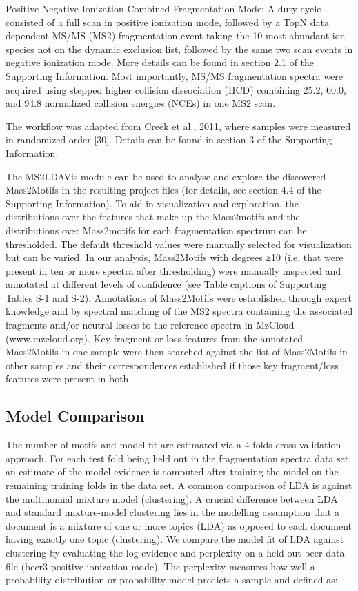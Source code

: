 Positive Negative Ionization Combined Fragmentation Mode:
A duty cycle consisted of a full scan in positive ionization mode, followed by a TopN data dependent MS/MS (MS2) fragmentation event taking the 10 most abundant ion species not on the dynamic exclusion list, followed by the same two scan events in negative ionization mode. More details can be found in section 2.1 of the Supporting Information. Most importantly, MS/MS fragmentation spectra were acquired using stepped higher collision dissociation (HCD) combining 25.2, 60.0, and 94.8 normalized collision energies (NCEs) in one MS2 scan.

The workflow was adapted from Creek et al., 2011, where samples were measured in randomized order [30]. Details can be found in section 3 of the Supporting Information.

The MS2LDAVis module can be used to analyse and explore the discovered Mass2Motifs in the resulting project files (for details, see section 4.4 of the Supporting Information). To aid in visualization and exploration, the distributions over the features that make up the Mass2motifs and the distributions over Mass2motifs for each fragmentation spectrum can be thresholded. The default threshold values were manually selected for visualization but can be varied. In our analysis, Mass2Motifs with degrees ≥10 (i.e. that were present in ten or more spectra after thresholding) were manually inspected and annotated at different levels of confidence (see Table captions of Supporting Tables S-1 and S-2). Annotations of Mass2Motifs were established through expert knowledge and by spectral matching of the MS2 spectra containing the associated fragments and/or neutral losses to the reference spectra in MzCloud (www.mzcloud.org). Key fragment or loss features from the annotated Mass2Motifs in one sample were then searched against the list of Mass2Motifs in other samples and their correspondences established if those key fragment/loss features were present in both.

\subsection{Model Comparison}

The number of motifs and model fit are estimated via a 4-folds cross-validation approach. For each test fold being held out in the fragmentation spectra data set, an estimate of the model evidence is computed after training the model on the remaining training folds in the data set. A common comparison of LDA is against the multinomial mixture model (clustering). A crucial difference between LDA and standard mixture-model clustering lies in the modelling assumption that a document is a mixture of one or more topics (LDA) as opposed to each document having exactly one topic (clustering). We compare the model fit of LDA against clustering by evaluating the log evidence and perplexity on a held-out beer data file (beer3 positive ionization mode). The perplexity measures how well a probability distribution or probability model predicts a sample and defined as:

